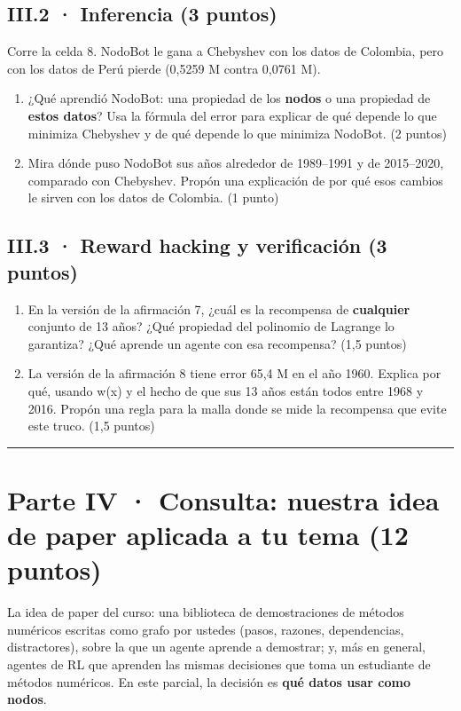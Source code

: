 \subsection{III.2 · Inferencia (3 puntos)}

Corre la celda 8. NodoBot le gana a Chebyshev con los datos de Colombia, pero con los datos de Perú pierde (0,5259 M contra 0,0761 M).

\begin{enumerate}
\def\labelenumi{(\alph{enumi})}
\item
  ¿Qué aprendió NodoBot: una propiedad de los \textbf{nodos} o una propiedad de \textbf{estos datos}? Usa la fórmula del error para explicar de qué depende lo que minimiza Chebyshev y de qué depende lo que minimiza NodoBot. (2 puntos)
\item
  Mira dónde puso NodoBot sus años alrededor de 1989--1991 y de 2015--2020, comparado con Chebyshev. Propón una explicación de por qué esos cambios le sirven con los datos de Colombia. (1 punto)
\end{enumerate}

\subsection{III.3 · Reward hacking y verificación (3 puntos)}

\begin{enumerate}
\def\labelenumi{(\alph{enumi})}
\item
  En la versión de la afirmación 7, ¿cuál es la recompensa de \textbf{cualquier} conjunto de 13 años? ¿Qué propiedad del polinomio de Lagrange lo garantiza? ¿Qué aprende un agente con esa recompensa? (1,5 puntos)
\item
  La versión de la afirmación 8 tiene error 65,4 M en el año 1960. Explica por qué, usando w(x) y el hecho de que sus 13 años están todos entre 1968 y 2016. Propón una regla para la malla donde se mide la recompensa que evite este truco. (1,5 puntos)
\end{enumerate}

\begin{center}\rule{0.5\linewidth}{0.5pt}\end{center}

\section{Parte IV · Consulta: nuestra idea de paper aplicada a tu tema (12 puntos)}

La idea de paper del curso: una biblioteca de demostraciones de métodos numéricos escritas como grafo por ustedes (pasos, razones, dependencias, distractores), sobre la que un agente aprende a demostrar; y, más en general, agentes de RL que aprenden las mismas decisiones que toma un estudiante de métodos numéricos. En este parcial, la decisión es \textbf{qué datos usar como nodos}.

